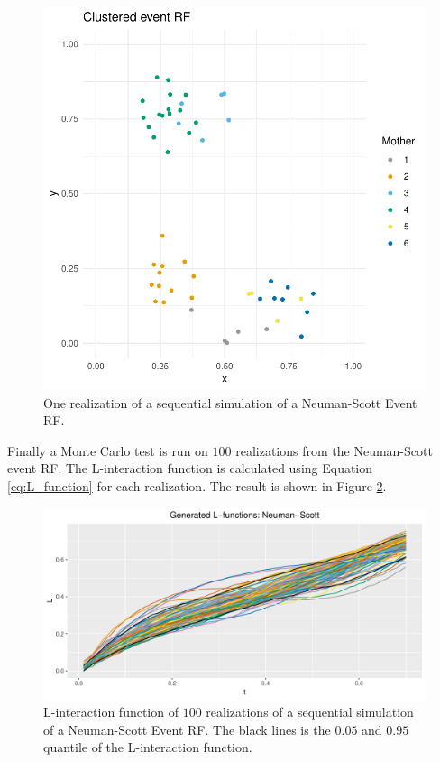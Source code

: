 \begin{figure}
    \centering
    \includegraphics[scale=0.95]{figures/cluster_event_rf.pdf}
    \caption{One realization of a sequential simulation of a Neuman-Scott Event RF.}
    \label{fig:cluster_event_rf}
\end{figure}

Finally a Monte Carlo test is run on $100$ realizations from the Neuman-Scott event RF. The L-interaction function is calculated using Equation \eqref{eq:L_function} for each realization. The result is shown in Figure \ref{fig:gen_ns_l}.

\begin{figure}
    \centering
    \includegraphics[scale=0.65]{figures/gen_ns_l.pdf}
    \caption{L-interaction function of $100$ realizations of a sequential simulation of a Neuman-Scott Event RF. The black lines is the $0.05$ and $0.95$ quantile of the L-interaction function.}
    \label{fig:gen_ns_l}
\end{figure}

